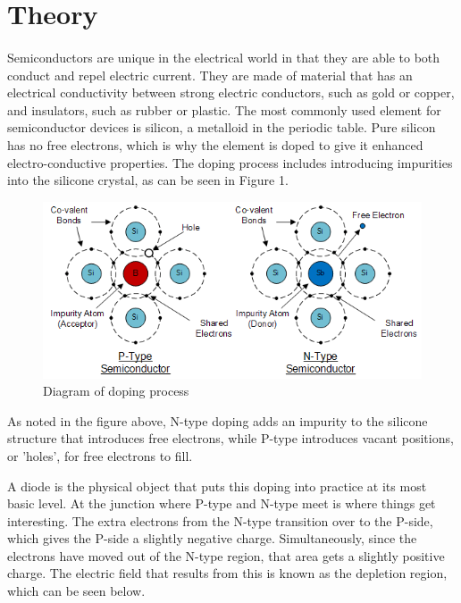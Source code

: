\documentclass[a4paper]{article}
\begin{document}
   

\section{Theory}
\paragraph{}
Semiconductors are unique in the electrical world in that they are able to both conduct and repel electric current. They are made of material that has an electrical conductivity between strong electric conductors, such as gold or copper, and insulators, such as rubber or plastic. The most commonly used element for semiconductor devices is silicon, a metalloid in the periodic table. Pure silicon has no free electrons, which is why the element is doped to give it enhanced electro-conductive properties. The doping process includes introducing impurities into the silicone crystal, as can be seen in Figure 1.

\begin{figure}[H]
\centering
\includegraphics[scale=0.8]{doping.PNG}
\caption{\label{fig} Diagram of doping process}
\end{figure}

As noted in the figure above, N-type doping adds an impurity to the silicone structure that introduces free electrons, while P-type introduces vacant positions, or 'holes', for free electrons to fill. 

A diode is the physical object that puts this doping into practice at its most basic level. At the junction where P-type and N-type meet is where things get interesting. The extra electrons from the N-type transition over to the P-side, which gives the P-side a slightly negative charge. Simultaneously, since the electrons have moved out of the N-type region, that area gets a slightly positive charge. The electric field that results from this is known as the depletion region, which can be seen below.
\end{document}
